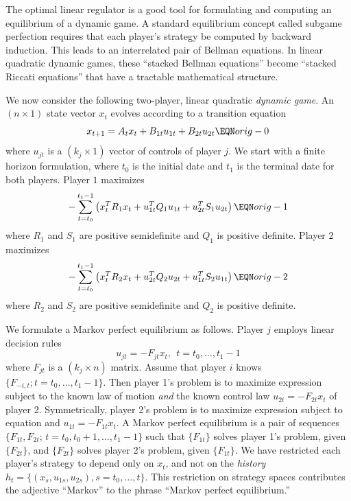   The optimal linear regulator is a good tool for formulating  and computing an equilibrium of a 
dynamic game.  A standard equilibrium
concept called subgame perfection  requires
that each player's strategy be computed
by backward induction.   This leads to an interrelated pair
of Bellman equations. In linear quadratic dynamic games, these
``stacked Bellman equations'' become ``stacked Riccati equations''
that have a tractable mathematical structure.

We now consider the following two-player, linear quadratic {\it dynamic
game}.  An $(n \times 1)$ state vector $x_t$ evolves according to a
transition equation
$$x_{t+1} = A_t x_t + B_{1t} u_{1t} + B_{2t} u_{2t}  \EQN orig-0$$
where
 $ u_{jt}$ is a $(k_j \times 1)$ vector of controls of
player  $j$.  We start with a finite horizon formulation, where
$t_0$ is the initial date and $t_1$ is the terminal date
for  both players.
Player $1$ maximizes
$$ - \sum_{t=t_0}^{t_1 - 1}  \left( x_t^T R_1 x_t + u_{1t}^T Q_1 u_{1t} +
u_{2t}^T S_1 u_{2t}\right) \EQN orig-1 $$
where $R_1$ and $S_1$ are positive semidefinite and
 $Q_1$ is positive definite.
Player 2 maximizes
$$ - \sum_{t=t_0}^{t_1 - 1} \left( x_t^T R_2 x_t + u_{2t}^T Q_2 u_{2t} +
u_{1t}^T S_2 u_{1t} \right) \EQN orig-2 $$
where $R_2$ and $S_2$ are positive semidefinite and $Q_2$ is positive definite.

We formulate a Markov perfect equilibrium as follows.  Player
$j$ employs linear decision rules
$$u_{jt} = - F_{jt}  x_t, \ \ t = t_0, \ldots, t_1 - 1$$
where $F_{jt}$ is a $(k_j \times n)$ matrix.  Assume that  player $i$ knows
$\{F_{-i,t}; t = t_0, \ldots, t_1 - 1 \}$.  Then player  1's problem is to
maximize expression
  subject to the known law of motion 
{\it and\/}
the known control law $u_{2t} = - F_{2t} x_t$ of player 2.
Symmetrically, player 2's problem is to maximize expression
 subject
to equation  and $u_{1t} = - F_{1t} x_t$. A Markov perfect
equilibrium is a pair of
sequences $\{F_{1t}, F_{2t};\, t = t_0, t_0 + 1 , \ldots,
t_1 - 1 \}$ such that $\{F_{1t}\}$ solves player 1's problem, given
$\{F_{2t}\}$, and $\{F_{2t}\}$ solves player 2's problem, given $\{F_{1t}\}$.
We have restricted each player's strategy to depend
only on $x_t$, and not on the {\it history} $h_t =\{(x_s, u_{1s}, u_{2s}),
s = t_0, \ldots, t\}$.
 This restriction on strategy spaces
 contributes the adjective
``Markov'' to the phrase ``Markov perfect equilibrium.''

